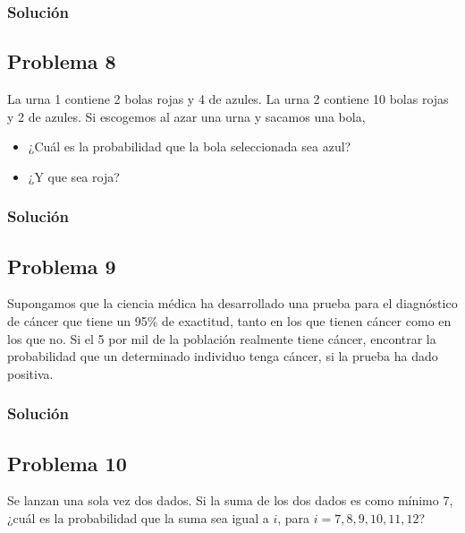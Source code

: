 \documentclass[
]{article}
\providecommand{\tightlist}{%
  \setlength{\itemsep}{0pt}\setlength{\parskip}{0pt}}
\begin{document}
\hypertarget{soluciuxf3n-6}{%
\subsubsection{Solución}\label{soluciuxf3n-6}}

\hypertarget{problema-8}{%
\subsection{Problema 8}\label{problema-8}}

La urna 1 contiene 2 bolas rojas y 4 de azules. La urna 2 contiene 10
bolas rojas y 2 de azules. Si escogemos al azar una urna y sacamos una
bola,

\begin{itemize}
\tightlist
\item
  ¿Cuál es la probabilidad que la bola seleccionada sea azul?
\item
  ¿Y que sea roja?
\end{itemize}

\hypertarget{soluciuxf3n-7}{%
\subsubsection{Solución}\label{soluciuxf3n-7}}

\hypertarget{problema-9}{%
\subsection{Problema 9}\label{problema-9}}

Supongamos que la ciencia médica ha desarrollado una prueba para el
diagnóstico de cáncer que tiene un 95\% de exactitud, tanto en los que
tienen cáncer como en los que no. Si el 5 por mil de la población
realmente tiene cáncer, encontrar la probabilidad que un determinado
individuo tenga cáncer, si la prueba ha dado positiva.

\hypertarget{soluciuxf3n-8}{%
\subsubsection{Solución}\label{soluciuxf3n-8}}

\hypertarget{problema-10}{%
\subsection{Problema 10}\label{problema-10}}

Se lanzan una sola vez dos dados. Si la suma de los dos dados es como
mínimo 7, ¿cuál es la probabilidad que la suma sea igual a \(i\), para
\(i=7,8,9,10,11,12\)?
\end{document}
